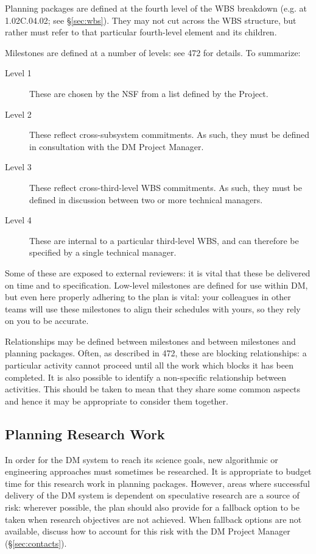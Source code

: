 Planning packages are defined at the fourth level of the WBS breakdown
(e.g. at 1.02C.04.02; see \S\ref{sec:wbs}). They may not cut
across the WBS structure, but rather must refer to that particular
fourth-level element and its children.

Milestones are defined at a number of levels: see 472 for details. To
summarize:

\begin{description}
\item[Level 1]
These are chosen by the NSF from a list defined by the Project.
\item[Level 2]
These reflect cross-subsystem commitments. As such, they must be defined
in consultation with the DM Project Manager.
\item[Level 3]
These reflect cross-third-level WBS commitments. As such, they must be
defined in discussion between two or more technical managers.
\item[Level 4]
These are internal to a particular third-level WBS, and can therefore be
specified by a single technical manager.
\end{description}

Some of these are exposed to external reviewers: it is vital that these
be delivered on time and to specification. Low-level milestones are
defined for use within DM, but even here properly adhering to the plan
is vital: your colleagues in other teams will use these milestones to
align their schedules with yours, so they rely on you to be accurate.

Relationships may be defined between milestones and between milestones
and planning packages. Often, as described in 472, these are blocking
relationships: a particular activity cannot proceed until all the work
which blocks it has been completed. It is also possible to identify a
non-specific relationship between activities. This should be taken to
mean that they share some common aspects and hence it may be appropriate
to consider them together.

\subsection{Planning Research Work}
\label{sec:long-term-research}

In order for the DM system to reach its science goals, new algorithmic
or engineering approaches must sometimes be researched. It is
appropriate to budget time for this research work in planning packages.
However, areas where successful delivery of the DM system is dependent
on speculative research are a source of risk: wherever possible, the
plan should also provide for a fallback option to be taken when research
objectives are not achieved. When fallback options are not available,
discuss how to account for this risk with the
DM Project Manager (\S\ref{sec:contacts}).

